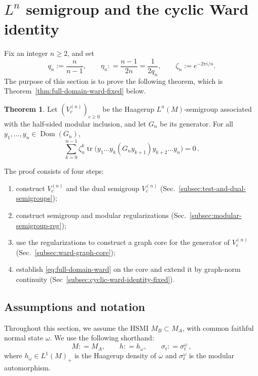 \documentclass[11pt,a4paper]{article}
\theoremstyle{plain}
\numberwithin{theorem}{section}
\theoremstyle{definition}
\newtheorem*{theorem*}{Theorem}
\newcommand{\?}{\overset{?}{=}}
\newcommand{\defeq}{\mathrel{\mathop:}=}
\DeclareMathOperator{\tr}{tr}
\DeclareMathOperator{\Dom}{Dom}
\begin{document}

\section{\texorpdfstring{$L^n$}{Ln} semigroup and the cyclic Ward identity}
\label{sec:cyclic-ward}

Fix an integer \(n\geq2\), and set
\[
        q_n:=\frac{n}{n-1},
        \qquad \eta_n\defeq \frac{n-1}{2n}=\frac{1}{2q_n}, \qquad
        \zeta_n:=e^{-2\pi i/n}.
\]
The purpose of this section is to prove the following theorem, which is Theorem~\ref{thm:full-domain-ward-fixed} below.
\begin{theorem*}
Let $(V_c^{(n)})_{c\geq0}$ be the Haagerup
\(L^n(M)\)-semigroup associated with the half-sided modular inclusion,
and let \(G_n\) be its generator.
For all $y_1,\ldots,y_n\in\Dom(G_n)$,
\begin{equation}\label{eq:full-domain-ward}
    \sum_{k=0}^{n-1}\zeta_n^k
  \tr\bigl(
    y_1\ldots y_k (G_ny_{k+1}) y_{k+2}\ldots y_n
  \bigr)=0\,.
\end{equation}
\end{theorem*}
The proof consists of four steps:
\begin{enumerate}
\item construct \(V_c^{(n)}\) and the dual semigroup \(V_c^{(n)}\) (Sec.~\ref{subsec:test-and-dual-semigroups});
\item construct semigroup and modular regularizations (Sec.~\ref{subsec:modular-semigroup-reg});
\item use the regularizations to construct a graph core for the generator of \(V_c^{(n)}\) (Sec.~\ref{subsec:ward-graph-core});
\item establish \eqref{eq:full-domain-ward} on the core and extend
it by graph-norm continuity (Sec~\ref{subsec:cyclic-ward-identity-fixed}).
\end{enumerate}

\subsection*{Assumptions and notation}
Throughout this section, we assume the HSMI $M_B\subset M_A$, with common faithful normal state $\omega$. We use the following shorthand:
\begin{equation}
  M\defeq M_A,\qquad h\defeq h_\omega,\qquad \sigma_t\defeq \sigma_t^\omega\,,
\end{equation}
where $h_\omega\in L^1(M)_+$ is the Haagerup density of $\omega$ and $\sigma_t^\omega$ is the modular automorphism.
\end{document}
